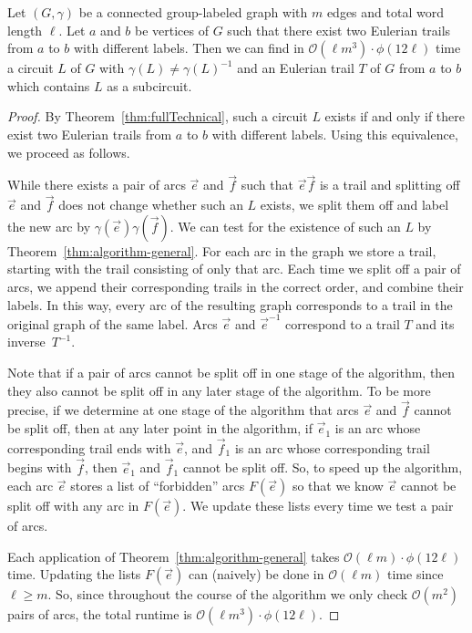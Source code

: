 \documentclass[a4paper, 12pt]{article}
\let\geq\geqslant
\begin{document}
\begin{corollary}
\label{cor:findTrails}
    Let $(G,\gamma)$ be a connected group-labeled graph with $m$ edges and total word length $\ell$. Let $a$ and $b$ be vertices of $G$ such that there exist two Eulerian trails from $a$ to $b$ with different labels. Then we can find in $\mathcal{O}(\ell m^3) \cdot \phi(12\ell)$ time a circuit $L$ of $G$ with $\gamma(L) \neq \gamma(L)^{-1}$ and an Eulerian trail $T$ of $G$ from $a$ to $b$ which contains $L$ as a subcircuit.
\end{corollary}
\begin{proof}
    By Theorem~\ref{thm:fullTechnical}, such a circuit $L$ exists if and only if there exist two Eulerian trails from $a$ to $b$ with different labels. Using this equivalence, we proceed as follows.

    While there exists a pair of arcs $\vec{e}$ and $\vec{f}$ such that $\vec{e} \vec{f}$ is a trail and splitting off $\vec{e}$ and $\vec{f}$ does not change whether such an $L$ exists, we split them off and label the new arc by $\gamma(\vec{e})\gamma(\vec{f})$. We can test for the existence of such an $L$ by Theorem~\ref{thm:algorithm-general}. For each arc in the graph we store a trail, starting with the trail consisting of only that arc. Each time we split off a pair of arcs, we append their corresponding trails in the correct order, and combine their labels. In this way, every arc of the resulting graph corresponds to a trail in the original graph of the same label. Arcs $\vec{e}$ and $\vec{e}^{-1}$ correspond to a trail $T$ and its inverse~$T^{-1}$.

    Note that if a pair of arcs cannot be split off in one stage of the algorithm, then they also cannot be split off in any later stage of the algorithm. To be more precise, if we determine at one stage of the algorithm that arcs $\vec{e}$ and $\vec{f}$ cannot be split off, then at any later point in the algorithm, if $\vec{e}_1$ is an arc whose corresponding trail ends with $\vec{e}$, and $\vec{f}_1$ is an arc whose corresponding trail begins with $\vec{f}$, then $\vec{e}_1$ and $\vec{f}_1$ cannot be split off. So, to speed up the algorithm, each arc $\vec{e}$ stores a list of ``forbidden'' arcs $F(\vec{e})$ so that we know $\vec{e}$ cannot be split off with any arc in $F(\vec{e})$. We update these lists every time we test a pair of arcs.

    Each application of Theorem~\ref{thm:algorithm-general} takes $\mathcal{O}(\ell m) \cdot \phi(12\ell)$ time. Updating the lists $F(\vec{e})$ can (naively) be done in $\mathcal{O}(\ell m)$ time since $\ell \geq m$. So, since throughout the course of the algorithm we only check $\mathcal{O}(m^2)$ pairs of arcs, the total runtime is $\mathcal{O}(\ell m^3) \cdot \phi(12\ell)$. 


\end{proof}
\end{document}
